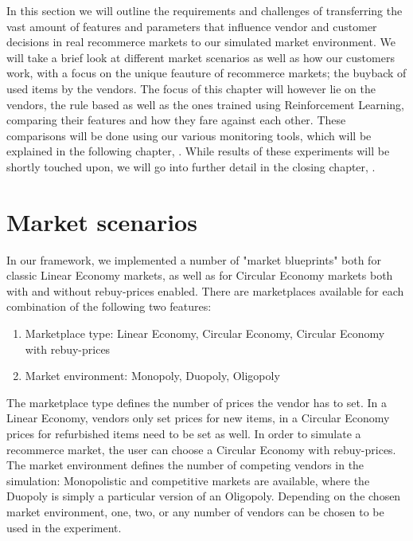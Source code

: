\begin{jointwork}
	In this section we will outline the requirements and challenges of transferring the vast amount of features and parameters that influence vendor and customer decisions in real recommerce markets to our simulated market environment. We will take a brief look at different market scenarios as well as how our customers work, with a focus on the unique feauture of recommerce markets; the buyback of used items by the vendors. The focus of this chapter will however lie on the vendors, the rule based as well as the ones trained using Reinforcement Learning, comparing their features and how they fare against each other. These comparisons will be done using our various monitoring tools, which will be explained in the following chapter, . While results of these experiments will be shortly touched upon, we will go into further detail in the closing chapter, .
\end{jointwork}

\section{Market scenarios} \label{sec:MarketScenarios}

In our framework, we implemented a number of "market blueprints" both for classic Linear Economy markets, as well as for Circular Economy markets both with and without rebuy-prices enabled. There are marketplaces available for each combination of the following two features:
\begin{enumerate}
    \item Marketplace type: Linear Economy, Circular Economy, Circular Economy with rebuy-prices
	\item Market environment: Monopoly, Duopoly, Oligopoly
\end{enumerate}
The marketplace type defines the number of prices the vendor has to set. In a Linear Economy, vendors only set prices for new items, in a Circular Economy prices for refurbished items need to be set as well. In order to simulate a recommerce market, the user can choose a Circular Economy with rebuy-prices.
The market environment defines the number of competing vendors in the simulation: Monopolistic and competitive markets are available, where the Duopoly is simply a particular version of an Oligopoly. Depending on the chosen market environment, one, two, or any number of vendors can be chosen to be used in the experiment.

